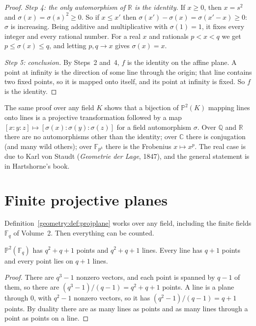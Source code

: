 \begin{proof}
\emph{Step 4: the only automorphism of $\mathbb R$ is the identity.} If $x\ge0$, then $x=s^2$ and $\sigma(x)=\sigma(s)^2\ge0$. So if $x\le x'$ then
$\sigma(x')-\sigma(x)=\sigma(x'-x)\ge0$: $\sigma$ is increasing. Being additive and multiplicative with $\sigma(1)=1$, it fixes every integer and
every rational number. For a real $x$ and rationals $p<x<q$ we get $p\le\sigma(x)\le q$, and letting $p,q\to x$ gives $\sigma(x)=x$.

\emph{Step 5: conclusion.} By Steps~2 and~4, $f$ is the identity on the affine plane. A point at infinity is the direction of some line through
the origin; that line contains two fixed points, so it is mapped onto itself, and its point at infinity is fixed. So $f$ is the identity.
\end{proof}

\begin{remark}
The same proof over any field $K$ shows that a bijection of $\mathbb P^2(K)$ mapping lines onto lines is a projective transformation followed by
a map $[x:y:z]\mapsto[\sigma(x):\sigma(y):\sigma(z)]$ for a field automorphism $\sigma$. Over $\mathbb Q$ and $\mathbb R$ there are no
automorphisms other than the identity; over $\mathbb C$ there is conjugation (and many wild others); over $\mathbb F_{p^k}$ there is the Frobenius
$x\mapsto x^p$. The real case is due to Karl von Staudt (\emph{Geometrie der Lage}, 1847), and the general statement is in Hartshorne's book.
\end{remark}

\section{Finite projective planes}\label{geometry:sec:finiteplanes}

Definition~\ref{geometry:def:projplane} works over any field, including the finite fields $\mathbb F_q$ of Volume~2. Then everything can be counted.

\begin{proposition}\label{geometry:prop:countplane}
$\mathbb P^2(\mathbb F_q)$ has $q^2+q+1$ points and $q^2+q+1$ lines. Every line has $q+1$ points and every point lies on $q+1$ lines.
\end{proposition}

\begin{proof}
There are $q^3-1$ nonzero vectors, and each point is spanned by $q-1$ of them, so there are $(q^3-1)/(q-1)=q^2+q+1$ points. A line is a plane
through $0$, with $q^2-1$ nonzero vectors, so it has $(q^2-1)/(q-1)=q+1$ points. By duality there are as many lines as points and as many lines
through a point as points on a line.
\end{proof}

